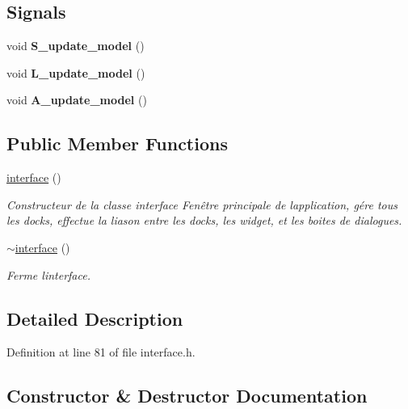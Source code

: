 \subsection*{Signals}
\begin{DoxyCompactItemize}
\item 
\mbox{\label{classinterface_a300de30478e2e2616b61abad24bf319a}} 
void {\bfseries S\+\_\+update\+\_\+model} ()
\item 
\mbox{\label{classinterface_a7d829b8bd407c58d27b0849f4891f155}} 
void {\bfseries L\+\_\+update\+\_\+model} ()
\item 
\mbox{\label{classinterface_ad09217bb805eb4405dfc8d0b7cc6e547}} 
void {\bfseries A\+\_\+update\+\_\+model} ()
\end{DoxyCompactItemize}
\subsection*{Public Member Functions}
\begin{DoxyCompactItemize}
\item 
\hyperlink{classinterface_a13e0ee4b9df1714d747d62ec46220c55}{interface} ()
\begin{DoxyCompactList}\small\item\em Constructeur de la classe interface Fenêtre principale de l\textquotesingle{}application, gére tous les docks, effectue la liason entre les docks, les widget, et les boites de dialogues. \end{DoxyCompactList}\item 
\hyperlink{classinterface_a8511f28c5bc5d3c24a24e9aaef4db502}{$\sim$interface} ()
\begin{DoxyCompactList}\small\item\em Ferme l\textquotesingle{}interface. \end{DoxyCompactList}\end{DoxyCompactItemize}


\subsection{Detailed Description}


Definition at line 81 of file interface.\+h.



\subsection{Constructor \& Destructor Documentation}
\mbox{\label{classinterface_a13e0ee4b9df1714d747d62ec46220c55}} 
